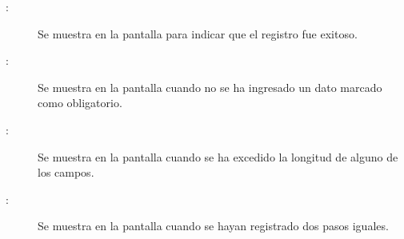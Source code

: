 	
\begin{description}

	\item[ :] Se muestra en la pantalla  para indicar que el registro fue exitoso.
	\item[ :] Se muestra en la pantalla  cuando no se ha ingresado un dato marcado como obligatorio.
	\item[ :] Se muestra en la pantalla  cuando se ha excedido la longitud de alguno de los campos.
	\item[ :] Se muestra en la pantalla  cuando se hayan registrado dos pasos iguales.
	
\end{description}

